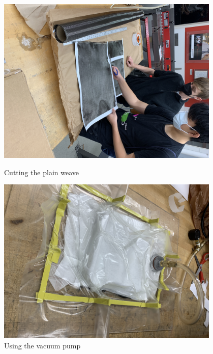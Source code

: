 \begin{figure}[ht]
\centering
\begin{minipage}[b]{.48\textwidth}
  \centering
  \includegraphics[width=0.95\textwidth]{Meetings/December/12-19-21/12-19-21_Hardware_Figure3 - Nathan Forrer.JPG}
  \caption{Cutting the plain weave}
  \label{fig:121921_3}
\end{minipage}%
\hfill%
\begin{minipage}[b]{.48\textwidth}
  \centering
  \includegraphics[width=0.95\textwidth]{Meetings/December/12-19-21/12-19-21_Hardware_Figure4 - Nathan Forrer.JPG}
  \caption{Using the vacuum pump}
  \label{fig:121921_4}
\end{minipage}
\end{figure}

